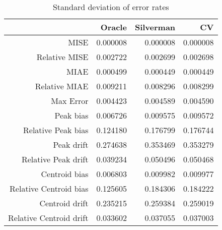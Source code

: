 \begin{table}[ht]
\centering
\begin{tabular}{rrrr}
  \hline
 & Oracle & Silverman & CV \\ 
  \hline
MISE & 0.000008 & 0.000008 & 0.000008 \\ 
  Relative MISE & 0.002722 & 0.002699 & 0.002698 \\ 
  MIAE & 0.000499 & 0.000449 & 0.000449 \\ 
  Relative MIAE & 0.009211 & 0.008296 & 0.008299 \\ 
  Max Error & 0.004423 & 0.004589 & 0.004590 \\ 
  Peak bias & 0.006726 & 0.009575 & 0.009572 \\ 
  Relative Peak bias & 0.124180 & 0.176799 & 0.176744 \\ 
  Peak drift & 0.274638 & 0.353469 & 0.353279 \\ 
  Relative Peak drift & 0.039234 & 0.050496 & 0.050468 \\ 
  Centroid bias & 0.006803 & 0.009982 & 0.009977 \\ 
  Relative Centroid bias & 0.125605 & 0.184306 & 0.184222 \\ 
  Centroid drift & 0.235215 & 0.259384 & 0.259019 \\ 
  Relative Centroid drift & 0.033602 & 0.037055 & 0.037003 \\ 
   \hline
\end{tabular}
\caption{Standard deviation of error rates} 
\label{tbl:stddev_error_rates}
\end{table}
